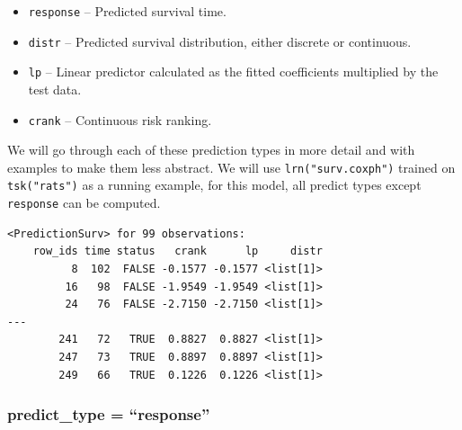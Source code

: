 \begin{itemize}
\tightlist
\item
  \texttt{response} -- Predicted survival time.
\item
  \texttt{distr} -- Predicted survival distribution, either discrete or
  continuous.
\item
  \texttt{lp} -- Linear predictor calculated as the fitted coefficients
  multiplied by the test data.
\item
  \texttt{crank} -- Continuous risk ranking.
\end{itemize}

We will go through each of these prediction types in more detail and
with examples to make them less abstract. We will use
\texttt{lrn("surv.coxph")} trained on
\texttt{tsk("rats")} as a running example, for this model, all predict
types except \texttt{response} can be computed.

\begin{Shaded}
\begin{Highlighting}[]
\OtherTok{=} \NormalTok{(}\NormalTok{)}
\OtherTok{=} 
\OtherTok{=} \NormalTok{(}\NormalTok{)}\SpecialCharTok{$}\SpecialCharTok{$}\SpecialCharTok{$}
  \SpecialCharTok{$}
\end{Highlighting}
\end{Shaded}

\begin{verbatim}
<PredictionSurv> for 99 observations:
    row_ids time status   crank      lp     distr
          8  102  FALSE -0.1577 -0.1577 <list[1]>
         16   98  FALSE -1.9549 -1.9549 <list[1]>
         24   76  FALSE -2.7150 -2.7150 <list[1]>
---                                              
        241   72   TRUE  0.8827  0.8827 <list[1]>
        247   73   TRUE  0.8897  0.8897 <list[1]>
        249   66   TRUE  0.1226  0.1226 <list[1]>
\end{verbatim}

\hypertarget{predict_type-response}{%
\subsubsection*{predict\_type =
``response''}\label{predict_type-response}}


